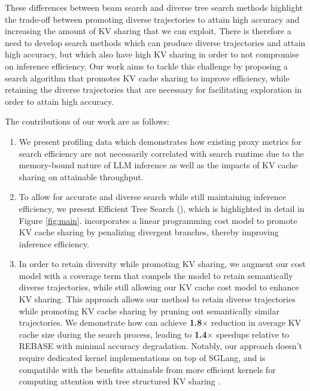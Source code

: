 These differences between beam search and diverse tree search methods highlight the trade-off between promoting diverse trajectories to attain high accuracy and increasing the amount of KV sharing that we can exploit.
There is therefore a need to develop search methods which can produce diverse trajectories and attain high accuracy, but which also have high KV sharing in order to not compromise on inference efficiency.
Our work aims to tackle this challenge by proposing a search algorithm that promotes KV cache sharing to improve efficiency, while retaining the diverse trajectories that are necessary for facilitating exploration in order to attain high accuracy.

The contributions of our work are as follows:
\begin{enumerate}[leftmargin=4mm]
    \item We present profiling data which demonstrates how existing proxy metrics for search efficiency are not necessarily correlated with search runtime due to the memory-bound nature of LLM inference as well as the impacts of KV cache sharing on attainable throughput.
    \item 
    To allow for accurate and diverse search while still maintaining inference efficiency, we present Efficient Tree Search (\ours), which is highlighted in detail in Figure \ref{fig:main}.
    \ours incorporates a linear programming cost model to promote KV cache sharing by penalizing divergent branches, thereby improving inference efficiency. 
    \item In order to retain diversity while promoting KV sharing, we augment our cost model with a coverage term that compels the model to retain semantically diverse trajectories,
    while still allowing our KV cache cost model to enhance KV sharing.
    This approach allows our method to retain diverse trajectories while promoting KV cache sharing by pruning out semantically similar trajectories.
    We demonstrate how \ours can achieve \textbf{1.8}$\times$ reduction in average KV cache size during the search process, leading to \textbf{1.4}$\times$ speedups relative to REBASE with minimal accuracy degradation. Notably, our approach doesn't require dedicated kernel implementations on top of SGLang, and is compatible with the benefits attainable from more efficient kernels for computing attention with tree structured KV sharing \cite{yao2024deft}.
\end{enumerate}